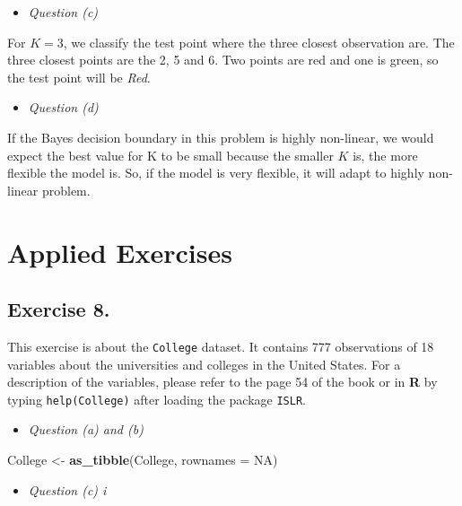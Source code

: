\documentclass[]{book}
\newenvironment{Shaded}{\begin{snugshade}}{\end{snugshade}}
\newcommand{\DataTypeTok}[1]{\textcolor[rgb]{0.13,0.29,0.53}{#1}}
\newcommand{\KeywordTok}[1]{\textcolor[rgb]{0.13,0.29,0.53}{\textbf{#1}}}
\newcommand{\NormalTok}[1]{#1}
\newcommand{\OtherTok}[1]{\textcolor[rgb]{0.56,0.35,0.01}{#1}}
\newcommand{\StringTok}[1]{\textcolor[rgb]{0.31,0.60,0.02}{#1}}
\providecommand{\tightlist}{%
  \setlength{\itemsep}{0pt}\setlength{\parskip}{0pt}}
\begin{document}
\begin{itemize}
\tightlist
\item
  \emph{Question (c)}
\end{itemize}

For \(K = 3\), we classify the test point where the three closest observation are. The three closest points are the 2, 5 and 6. Two points are red and one is green, so the test point will be \emph{Red}.

\begin{itemize}
\tightlist
\item
  \emph{Question (d)}
\end{itemize}

If the Bayes decision boundary in this problem is highly non-linear, we would expect the best value for K to be small because the smaller \(K\) is, the more flexible the model is. So, if the model is very flexible, it will adapt to highly non-linear problem.

\hypertarget{applied-exercises}{%
\section{Applied Exercises}\label{applied-exercises}}

\hypertarget{exercise-8.}{%
\subsection{Exercise 8.}\label{exercise-8.}}

This exercise is about the \texttt{College} dataset. It contains 777 observations of 18 variables about the universities and colleges in the United States. For a description of the variables, please refer to the page 54 of the book or in \textbf{R} by typing \texttt{help(College)} after loading the package \texttt{ISLR}.

\begin{itemize}
\tightlist
\item
  \emph{Question (a) and (b)}
\end{itemize}

\begin{Shaded}
\begin{Highlighting}[]
\NormalTok{College <-}\StringTok{ }\KeywordTok{as_tibble}\NormalTok{(College, }\DataTypeTok{rownames =} \OtherTok{NA}\NormalTok{)}
\end{Highlighting}
\end{Shaded}

\begin{itemize}
\tightlist
\item
  \emph{Question (c) i}
\end{itemize}
\end{document}
